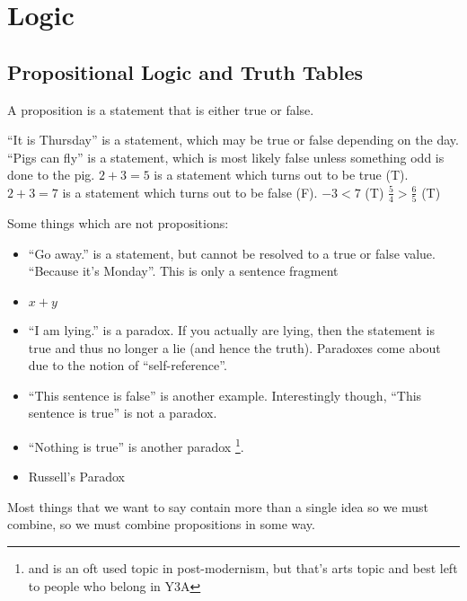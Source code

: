 \chapter{Logic}
\label{chap:Review}

\section{Propositional Logic and Truth Tables}
\label{sec:PropositionalLogicAndTruthTables}

A proposition is a statement that is either true or false.

``It is Thursday'' is a statement, which may be true or false depending on the
day.
``Pigs can fly'' is a statement, which is most likely false unless something odd
is done to the pig.
$2 + 3 = 5$ is a statement which turns out to be true (T).
$2 + 3 = 7$ is a statement which turns out to be false (F).
$ -3 < 7  $ (T)
$\frac{5}{4} > \frac{6}{5}$ (T)

Some things which are not propositions:
\begin{itemize}
  \item ``Go away.'' is a statement, but cannot be resolved to a true or false
  value. ``Because it's Monday''. This is only a sentence fragment 
  \item $ x + y $
  \item ``I am lying.'' is a paradox. If you actually are lying, then the
  statement is true and thus no longer a lie (and hence the truth). Paradoxes come about due to
the notion of ``self-reference''.
  \item ``This sentence is false'' is another example. Interestingly though,
  ``This sentence is true'' is not a paradox.
  \item ``Nothing is true'' is another paradox \footnote{and is an oft used
  topic in post-modernism, but that's arts topic and best left to people who
  belong in Y3A}.
  \item Russell's Paradox
\end{itemize}

Most things that we want to say contain more than a single idea so we must
combine, so we must combine propositions in some way.

